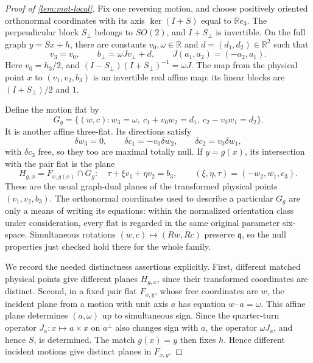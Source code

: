 \begin{proof}[Proof of \cref{lem:mot-local}]
Fix one reversing motion, and choose positively oriented orthonormal coordinates with its axis $\ker(I+S)$ equal to $\mathbb{R} e_3$.  The perpendicular block $S_\perp$ belongs to $SO(2)$, and $I+S_\perp$ is invertible.  On the full graph $y=Sx+h$, there are constants $v_0,\omega\in\mathbb{R}$ and $d=(d_1,d_2)\in\mathbb{R}^2$ such that
\begin{equation}
\label{eq:mot-graph-cayley}
 v_3=v_0,\qquad b_\perp=\omega Jv_\perp+d,
 \qquad J(a_1,a_2)=(-a_2,a_1).
\end{equation}
Here $v_0=h_3/2$, and $(I-S_\perp)(I+S_\perp)^{-1}=\omega J$. The map from the physical point $x$ to $(v_1,v_2,b_3)$ is an invertible real affine map: its linear blocks are $(I+S_\perp)/2$ and $1$.

Define the motion flat by
\begin{equation}
\label{eq:mot-motion-flat}
 G_g=\{(w,c):w_3=\omega,\
             c_1+v_0w_2=d_1,\
             c_2-v_0w_1=d_2\}.
\end{equation}
It is another affine three-flat.  Its directions satisfy
\[
 \delta w_3=0,\qquad
 \delta c_1=-v_0\delta w_2,\qquad
 \delta c_2=v_0\delta w_1,
\]
with $\delta c_3$ free, so they too are maximal totally null. If $y=g(x)$, its intersection with the pair flat is the plane
\begin{equation}
\label{eq:mot-dual-plane}
 H_{g,x}=F_{x,g(x)}\cap G_g:
 \quad \tau+\xi v_1+\eta v_2=b_3,
 \qquad (\xi,\eta,\tau)=(-w_2,w_1,c_3).
\end{equation}
These are the usual graph-dual planes of the transformed physical points $(v_1,v_2,b_3)$. The orthonormal coordinates used to describe a particular $G_g$ are only a means of writing its equations: within the normalized orientation class under consideration, every flat is regarded in the same original parameter six-space.  Simultaneous rotations $(w,c)\mapsto(Rw,Rc)$ preserve $\mathfrak{q}$, so the null properties just checked hold there for the whole family.

We record the needed distinctness assertions explicitly. First, different matched physical points give different planes $H_{g,x}$, since their transformed coordinates are distinct. Second, in a fixed pair flat $F_{x,y}$, whose free coordinates are $w$, the incident plane from a motion with unit axis $a$ has equation $w\cdot a=\omega$.  This affine plane determines $(a,\omega)$ up to simultaneous sign.  Since the quarter-turn operator $J_a:x\mapsto a\times x$ on $a^\perp$ also changes sign with $a$, the operator $\omega J_a$, and hence $S$, is determined.  The match $g(x)=y$ then fixes $h$.  Hence different incident motions give distinct planes in $F_{x,y}$.


\end{proof}
